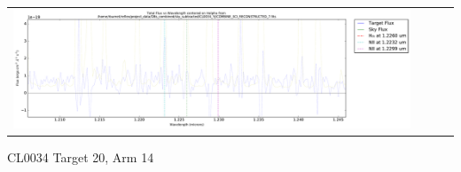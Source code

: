 \documentclass[10pt,letterpaper]{article}
\begin{document}
\begin{table}[h!]
\begin{center}
\begin{tabular}{ >{\centering\arraybackslash}m{2.5in} >{\centering\arraybackslash}m{2.5in} >{\centering\arraybackslash}m{2.5in} >{\centering\arraybackslash}m{2.3in}}
\includegraphics[scale=0.45]{../figures/CL0034_YJ/COMBINE_SCI_RECONSTRUCTED_7_Halpha.pdf}
\end{tabular}
\end{center}
\end{table}

\newpage

CL0034 Target 20, Arm 14 \\
\end{document}
